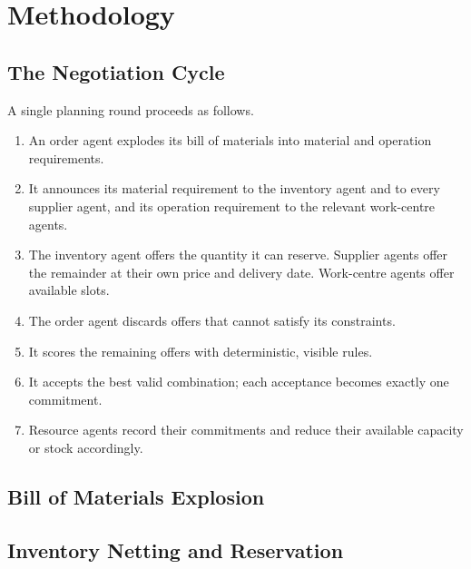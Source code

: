 \chapter{Methodology}
\label{ch:methodology}

\section{The Negotiation Cycle}

A single planning round proceeds as follows.

\begin{enumerate}[nosep]
  \item An order agent explodes its bill of materials into material and
        operation requirements.
  \item It announces its material requirement to the inventory agent and to
        every supplier agent, and its operation requirement to the relevant
        work-centre agents.
  \item The inventory agent offers the quantity it can reserve. Supplier
        agents offer the remainder at their own price and delivery date.
        Work-centre agents offer available slots.
  \item The order agent discards offers that cannot satisfy its constraints.
  \item It scores the remaining offers with deterministic, visible rules.
  \item It accepts the best valid combination; each acceptance becomes exactly
        one commitment.
  \item Resource agents record their commitments and reduce their available
        capacity or stock accordingly.
\end{enumerate}


\section{Bill of Materials Explosion}


\section{Inventory Netting and Reservation}


